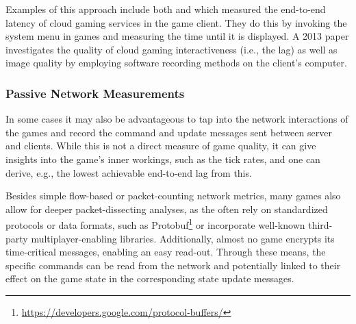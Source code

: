 Examples of this approach include both \cite{Chen:2011:MLC:2072298.2071991} and \cite{6670099} which measured the end-to-end latency of cloud gaming services in the game client. They do this by invoking the system menu in games and measuring the time until it is displayed. A 2013 paper \cite{6574660} investigates the quality of cloud gaming interactiveness (i.e., the lag) as well as image quality by employing software recording methods on the client's computer.


\subsubsection{Passive Network Measurements}

In some cases it may also be advantageous to tap into the network interactions of the games and record the command and update messages sent between server and clients. While this is not a direct measure of game quality, it can give insights into the game's inner workings, such as the tick rates, and one can derive, e.g., the lowest achievable end-to-end lag from this.


Besides simple flow-based or packet-counting network metrics, many games also allow for deeper packet-dissecting analyses, as the often rely on standardized protocols or data formats, such as Protobuf\footnote{\url{https://developers.google.com/protocol-buffers/}} or incorporate well-known third-party multiplayer-enabling libraries. %
Additionally, almost no game encrypts its time-critical messages, enabling an easy read-out. Through these means, the specific commands can be read from the network and potentially linked to their effect on the game state in the corresponding state update messages.


